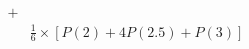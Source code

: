 \documentclass[preview]{standalone}
\begin{document}
\begin{align*}
+&\\&\frac{1}{6}\times[P(2)+4P(2.5)+P(3)]
\end{align*}
\end{document}
